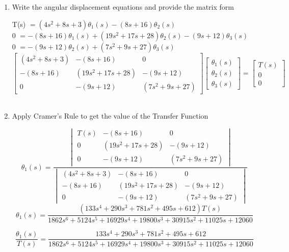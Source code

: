 \begin{fold}
\begin{enumerate}[label=(\alph*),itemindent=*, itemindent=*, leftmargin=*, nolistsep]
\begin{center}
        \end{center}

        \vspace{15pt}

		\item Write the angular displacement equations and provide the matrix form
\begin{center}
	T(s) $= (4s^2 + 8s + 3)\theta_1(s) - (8s + 16)\theta_2(s)$\\
	0 $= -(8s + 16)\theta_1(s) + (19s^2 + 17s + 28)\theta_2(s) - (9s + 12)\theta_3(s)$\\
	0 $= -(9s + 12)\theta_2(s) + (7s^2 + 9s + 27)\theta_3(s)$
	\[
		\begin{bmatrix}
		(4s^2 + 8s + 3) & -(8s + 16) & 0\\
		-(8s + 16) & (19s^2 + 17s + 28) & -(9s + 12)\\
		0 & -(9s + 12) & (7s^2 + 9s + 27)
		\end{bmatrix}
		\begin{bmatrix}
		\theta_1(s) \\
		\theta_2(s) \\
		\theta_3(s)
		\end{bmatrix}
		=
		\begin{bmatrix}
		T(s)\\
		0\\
		0
		\end{bmatrix}
	\]\\
\end{center}
		\item Apply Cramer's Rule to get the value of the Transfer Function
\begin{center}
	\[
		\theta_1(s) = 
			\frac{\begin{vmatrix}
				T(s) & -(8s + 16) & 0\\
				0 & (19s^2 + 17s + 28) & -(9s + 12)\\
				0 & -(9s + 12) & (7s^2 + 9s + 27)
			\end{vmatrix}
		}{\begin{vmatrix}
				(4s^2 + 8s + 3) & -(8s + 16) & 0\\
				-(8s + 16) & (19s^2 + 17s + 28) & -(9s + 12)\\
				0 & -(9s + 12) & (7s^2 + 9s + 27)
			\end{vmatrix}
		}
	\]
	\[
	\theta_1(s) = \frac{(133s^4 + 290s^3 + 781s^2 + 495s + 612)T(s)}{1862s^6 + 5124s^5 + 16929s^4 + 19800s^3 + 30915s^2 + 11025s + 12060}
	\] 

	\[
	\boxed{\frac{\theta_1(s)}{T(s)} = \frac{133s^4 + 290s^3 + 781s^2 + 495s + 612}{1862s^6 + 5124s^5 + 16929s^4 + 19800s^3 + 30915s^2 + 11025s + 12060}}
	\]
\end{center}
	\end{enumerate}


\end{fold}


